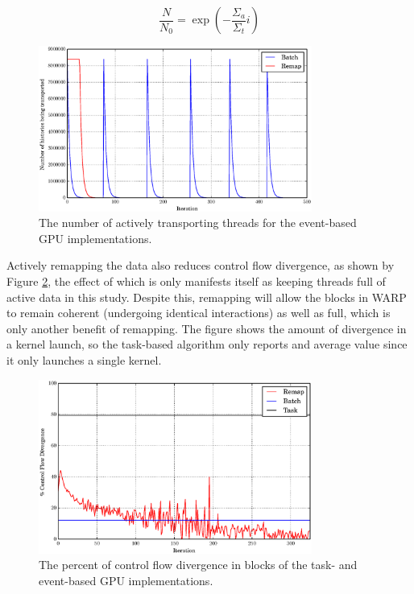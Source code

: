 \begin{equation}
\label{depleted}
\frac{N}{N_0}=\exp \left(-\frac{\Sigma_a}{\Sigma_t} i \right)
\end{equation}

\begin{figure}[h!] 
  \centering
    \includegraphics[width=0.8\textwidth]{graphics/prelim_active.eps}
     \caption{The number of actively transporting threads for the event-based GPU implementations. \label{prelim_active} }
\end{figure}

Actively remapping the data also reduces control flow divergence, as shown by Figure \ref{prelim_divergence}, the effect of which is only manifests itself as keeping threads full of active data in this study.  Despite this, remapping will allow the blocks in WARP to remain coherent (undergoing identical interactions) as well as full, which is only another benefit of remapping.  The figure shows the amount of divergence in a kernel launch, so the task-based algorithm only reports and average value since it only launches a single kernel.

\begin{figure}[h!] 
  \centering
    \includegraphics[width=0.8\textwidth]{graphics/prelim_divergence.eps}
     \caption{The percent of control flow divergence in blocks of the task- and event-based GPU implementations. \label{prelim_divergence} }
\end{figure}


